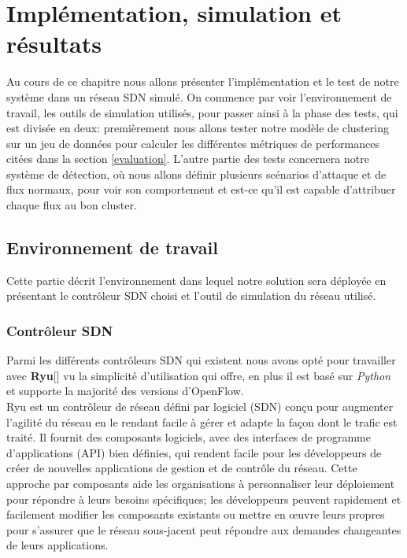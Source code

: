 \chapter{Implémentation, simulation et résultats}

\label{Chapter5}
Au cours de ce chapitre nous allons présenter l'implémentation et le test de notre système dans un réseau SDN simulé. On commence par voir l'environnement de travail, les outils de simulation utilisés, pour passer ainsi à la phase des tests, qui est divisée en deux: premièrement nous allons tester notre modèle de clustering sur un jeu de données pour calculer les différentes métriques de performances citées dans la section \ref{evaluation}. L'autre partie des tests concernera notre système de détection, où nous allons définir plusieurs scénarios d'attaque et de flux normaux, pour voir son comportement et est-ce qu'il est capable d'attribuer chaque flux au bon cluster. 


\section{Environnement de travail}
Cette partie décrit l'environnement dans lequel notre solution sera déployée en présentant le contrôleur SDN choisi et l'outil de simulation du réseau utilisé.

\subsection{Contrôleur SDN}
Parmi les différents contrôleurs SDN qui existent nous avons opté pour travailler avec \textbf{Ryu}[\cite{4}] vu la simplicité d'utilisation qui offre, en plus il est basé sur \textit{Python} et supporte la majorité des versions d’OpenFlow.\\

\noindent Ryu est un contrôleur de réseau défini par logiciel (SDN) conçu pour augmenter l’agilité du réseau en le rendant facile à gérer et adapte la façon dont le trafic est traité. Il fournit des composants logiciels, avec des interfaces de programme d'applications (API) bien définies, qui rendent facile pour les développeurs de créer de nouvelles applications de gestion et de contrôle du réseau. Cette approche par composants aide les organisations à personnaliser leur déploiement pour répondre à leurs besoins spécifiques; les développeurs peuvent rapidement et facilement modifier les composants existants ou mettre en œuvre leurs propres pour s’assurer que le réseau sous-jacent peut répondre aux demandes changeantes de leurs applications.\\

